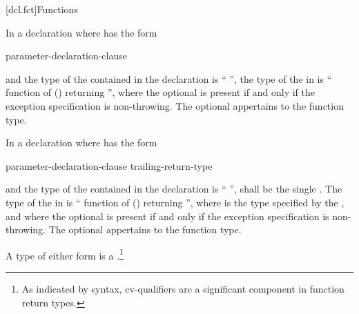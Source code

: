 [dcl.fct]{Functions}%

\pnum
{}%
In a declaration
where
has the form
\begin{ncsimplebnf}
 \terminal{(} parameter-declaration-clause \terminal{)} \br
\bnfindent{}  
\end{ncsimplebnf}
and the type of the contained
in the declaration
is
``
'',
the type of the
in
is
``
function of
()
 
returning '',
where the optional  is present
if and only if
the exception specification is non-throwing.
The optional 
appertains to the function type.

\pnum
In a declaration
where
has the form
\begin{ncsimplebnf}
 \terminal{(} parameter-declaration-clause \terminal{)} \br
\bnfindent{}   trailing-return-type
\end{ncsimplebnf}
and the type of the contained
in the declaration
is
`` '',
 shall be the single  .
The type of the
in
is
``
function of
()
 
returning '',
where  is the type specified by
the , and
where the optional  is present if and only if
the exception specification is non-throwing.
The optional 
appertains to the function type.

\pnum
{}%
A type of either form is a .\footnote{As indicated by syntax, cv-qualifiers are a significant component in function return types.}

